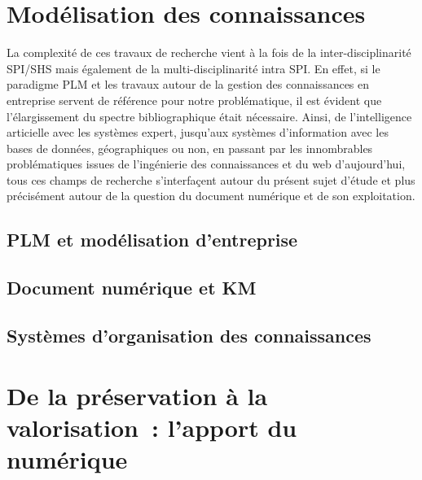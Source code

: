 \documentclass[a4paper,11pt,french]{article}
\begin{document}
\section{Modélisation des connaissances}

La complexité de ces travaux de recherche vient à la fois de la inter-disciplinarité SPI/SHS mais également de la multi-disciplinarité intra SPI. En effet, si le paradigme PLM et les travaux autour de la gestion des connaissances en entreprise servent de référence pour notre problématique, il est évident que l'élargissement du spectre bibliographique était nécessaire. Ainsi, de l'intelligence articielle avec les systèmes expert, jusqu'aux systèmes d'information avec les bases de données, géographiques ou non, en passant par les innombrables problématiques issues de l'ingénierie des connaissances et du web d'aujourd'hui, tous ces champs de recherche s'interfaçent autour du présent sujet d'étude et plus précisément autour de la question du document numérique et de son exploitation.

\subsection{PLM et modélisation d'entreprise}

\subsection{Document numérique et KM}

\subsection{Systèmes d'organisation des connaissances}

\section{De la préservation à la valorisation~: l'apport du numérique}


%    
%   
\end{document}
